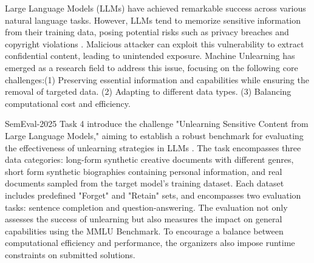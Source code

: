 \documentclass[11pt]{article}
\begin{document}
\fi


Large Language Models (LLMs) have achieved remarkable success across various natural language tasks. However, LLMs tend to memorize sensitive information from their training data, posing potential risks such as privacy breaches and copyright violations \cite{wang2024machine}. Malicious attacker can exploit this vulnerability to extract confidential content, leading to unintended exposure. Machine Unlearning has emerged as a research field to address this issue, focusing on the following core challenges\cite{qu2023learn, li2025machine}:(1) Preserving essential information and capabilities while ensuring the removal of targeted data. (2) Adapting to different data types. (3) Balancing computational cost and efficiency.


SemEval-2025 Task 4 introduce the challenge "Unlearning Sensitive Content from Large Language Models," aiming to establish a robust benchmark for evaluating the effectiveness of unlearning strategies in LLMs \cite{ramakrishna2025lumellmunlearningmultitask}. The task encompasses three data categories: long-form synthetic creative documents with different genres, short form synthetic biographies containing personal information, and real documents sampled from the target model’s training dataset. Each dataset includes predefined "Forget" and "Retain" sets, and encompasses two evaluation tasks: sentence completion and question-answering. The evaluation not only assesses the success of unlearning but also measures the impact on general capabilities using the MMLU Benchmark. To encourage a balance between computational efficiency and performance, the organizers also impose runtime constraints on submitted solutions.
\end{document}
